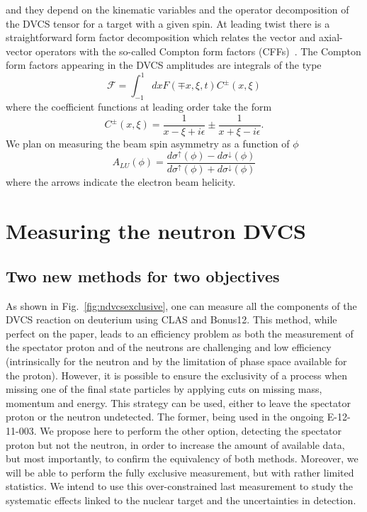 and they depend on the kinematic variables and the operator decomposition of 
the DVCS tensor for a target with a given spin. At leading twist there is a 
straightforward form factor decomposition which relates the vector and 
axial-vector operators with the so-called Compton form factors 
(CFFs)~\cite{Belitsky:2000gz}. The Compton form factors appearing in the DVCS 
amplitudes are integrals of the type
%
%
\begin{equation}
   \mathcal{F} = \int_{-1}^{1} dx F(\mp x,\xi,t) C^{\pm}(x,\xi)
\end{equation}
where the coefficient functions at leading order take the form
\begin{equation}
   C^{\pm}(x,\xi) = \frac{1}{x-\xi + i\epsilon} \pm \frac{1}{x+\xi - 
   i\epsilon}.
\end{equation}
%
We plan on measuring the beam spin asymmetry as a function of $\phi$
\begin{equation}
   A_{LU}(\phi) = \frac{d\sigma^{\uparrow}(\phi) - 
   d\sigma^{\downarrow}(\phi)}{d\sigma^{\uparrow}(\phi) + 
   d\sigma^{\downarrow}(\phi)}
\end{equation}
%
where the arrows indicate the electron beam helicity. 

\section{Measuring the neutron DVCS}

\subsection{Two new methods for two objectives}

As shown in Fig.~\ref{fig:ndvcsexclusive}, one can measure all the components of 
the DVCS reaction on deuterium using CLAS and Bonus12. This method, while perfect 
on the paper, leads to an efficiency problem
as both the measurement of the spectator proton and of the neutrons are challenging
and low efficiency (intrinsically for the neutron and by the limitation of phase 
space available for the proton). However, it is possible to ensure the exclusivity
of a process when missing one of the final state particles by applying cuts on
missing mass, momentum and energy. This strategy can be used, either to leave the
spectator proton or the neutron undetected. The former, being used in the ongoing
E-12-11-003. We propose here to perform the other option, detecting the spectator proton
but not the neutron, in order to increase the amount of available data, but most 
importantly, to confirm the equivalency of both methods. Moreover, we will be able to
perform the fully exclusive measurement, but with rather limited statistics. We
intend to use this over-constrained last measurement to study the systematic effects 
linked to the nuclear target and the uncertainties in detection.

